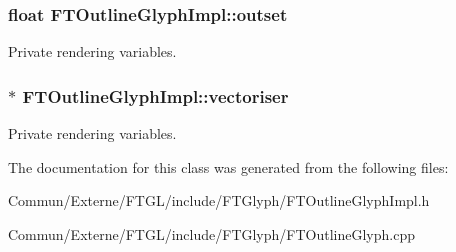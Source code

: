\subsubsection[{\texorpdfstring{outset}{outset}}]{\setlength{\rightskip}{0pt plus 5cm}float F\+T\+Outline\+Glyph\+Impl\+::outset\hspace{0.3cm}{\ttfamily [private]}}\hypertarget{class_f_t_outline_glyph_impl_a35dc72ebbe89caaa6e9011fcfd342e93}{}\label{class_f_t_outline_glyph_impl_a35dc72ebbe89caaa6e9011fcfd342e93}
Private rendering variables. 
\subsubsection[{\texorpdfstring{vectoriser}{vectoriser}}]{$\ast$ F\+T\+Outline\+Glyph\+Impl\+::vectoriser\hspace{0.3cm}{\ttfamily [private]}}\hypertarget{class_f_t_outline_glyph_impl_ae4dab6177d2727633d49456fa475b941}{}\label{class_f_t_outline_glyph_impl_ae4dab6177d2727633d49456fa475b941}
Private rendering variables. 

The documentation for this class was generated from the following files\+:\begin{DoxyCompactItemize}
\item 
Commun/\+Externe/\+F\+T\+G\+L/include/\+F\+T\+Glyph/F\+T\+Outline\+Glyph\+Impl.\+h\item 
Commun/\+Externe/\+F\+T\+G\+L/include/\+F\+T\+Glyph/F\+T\+Outline\+Glyph.\+cpp\end{DoxyCompactItemize}
